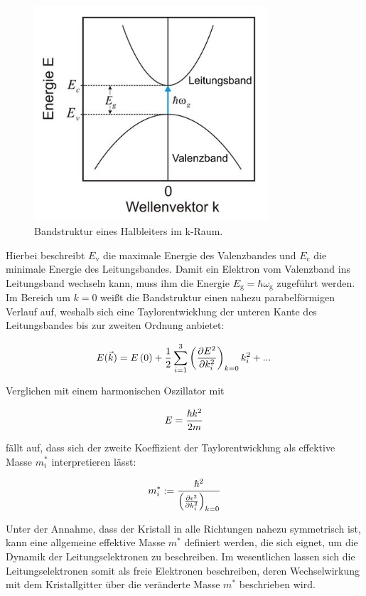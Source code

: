 \begin{figure} [H]
    \centering
    \includegraphics[height=8cm]{content/Halbleiter.png}
    \caption{Bandstruktur eines Halbleiters im k-Raum. \cite{Halbleiter}}
    \label{fig:Halbleiter}
\end{figure}

Hierbei beschreibt $E_{\text{v}}$ die maximale Energie des Valenzbandes und $E_{\text{c}}$ die minimale Energie des Leitungsbandes.
Damit ein Elektron vom Valenzband ins Leitungsband wechseln kann, muss ihm die Energie $E_{\text{g}}=\hbar \omega_{\text{g}}$
zugeführt werden.
Im Bereich um $k=0$ weißt die Bandstruktur einen nahezu parabelförmigen Verlauf auf, weshalb sich eine Taylorentwicklung der unteren Kante des
Leitungsbandes bis zur zweiten Ordnung anbietet:

\begin{equation}
    E(\vec{k})=E\left(0\right)+\frac{1}{2}\sum_{i=1}^3\left(\frac{\partial E^2}{\partial k_i^2}\right)_{k=0}k_i^2+...\,
    \notag
\end{equation}
 
Verglichen mit einem harmonischen Oszillator mit

\begin{equation}
    E=\frac{\hbar k^2}{2m}\,
    \notag
\end{equation}

fällt auf, dass sich der zweite Koeffizient der Taylorentwicklung als effektive Masse $m_i^*$ interpretieren lässt:
    
\begin{equation}
    m_i^*:=\frac{\hbar^2}{\left(\frac{\partial\epsilon^2}{\partial k_i^2}\right)_{k=0}}
    \notag
\end{equation}

Unter der Annahme, dass der Kristall in alle Richtungen nahezu symmetrisch ist, kann eine allgemeine effektive Masse
$m^*$ definiert werden, die sich eignet, um die Dynamik der Leitungselektronen zu beschreiben. Im wesentlichen
lassen sich die Leitungselektronen somit als freie Elektronen beschreiben, deren Wechselwirkung mit dem Kristallgitter
über die veränderte Masse $m^*$ beschrieben wird.

